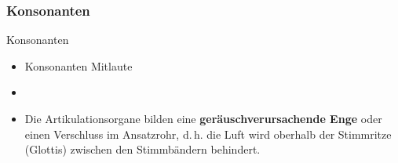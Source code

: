 


%
\subsubsection{Konsonanten}

\begin{frame}{Konsonanten}

	\begin{itemize}
		\item Konsonanten \ras Mitlaute
		\item[]
		\item Die Artikulationsorgane bilden eine \textbf{geräuschverursachende Enge} oder einen Verschluss im Ansatzrohr, d.\,h. die Luft wird oberhalb der Stimmritze (Glottis) zwischen den Stimmbändern behindert.
	\end{itemize}
	
\end{frame}




